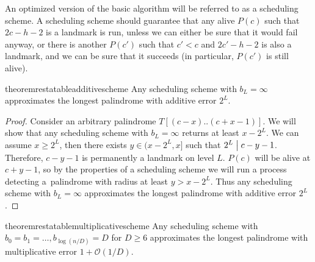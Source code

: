 \documentclass{article}[11pt,letter]
\newcommand{\bigo}{\mathcal{O}}
\newcommand{\head}{h}
\newcommand{\divides}{\bigm|}
\begin{document}
An optimized version of the basic algorithm will be referred
to as a scheduling scheme. A scheduling scheme should guarantee that any alive $P(c)$ such that $2c-\head-2$ is a landmark is run, unless we 
can either be sure that it would fail anyway, or there is another $P(c')$ such that $c'<c$ and $2c'-\head-2$ is also a landmark, and we can be sure
that it succeeds (in particular, $P(c')$ is still alive).

\begin{restatable}{theorem}{restatableadditivescheme}
\label{additive_scheme}
Any scheduling scheme with $b_L = \infty$ approximates the longest palindrome with additive error
$2^L$.
\end{restatable}


\begin{proof}
Consider an arbitrary palindrome $T[(c-x)..(c+x-1)]$. We will show that any scheduling scheme with $b_{L}=\infty$ returns at least $x-2^{L}$.
We can assume $x \geq 2^{L}$, then there exists $y\in (x-2^{L},x]$ such that $2^{L}\divides c-y-1$.
Therefore, $c-y-1$ is permanently a landmark on level $L$. $P(c)$ will be alive at $c+y-1$, so by the properties of a scheduling
scheme we will run a process detecting a~palindrome with radius at least $y > x-2^{L}$.
Thus any scheduling scheme with $b_{L}=\infty$ approximates the longest palindrome with additive error $2^{L}$.
\end{proof}

\begin{restatable}{theorem}{restatablemultiplicativescheme}
\label{multiplicative_scheme}
Any scheduling scheme with $b_0 = b_{1} = \ldots, b_{\log(n/D)} = D$ for $D\geq 6$ approximates the longest palindrome with multiplicative 
error $1+\bigo(1/D)$.
\end{restatable}
\end{document}
